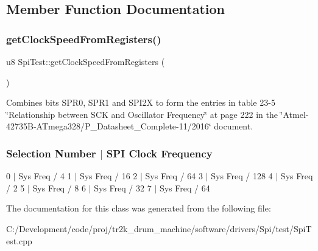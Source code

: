 \subsection{Member Function Documentation}
\mbox{\label{class_spi_test_a6f3260038241bf80545cddf4e1d73130}} 
\subsubsection{\texorpdfstring{getClockSpeedFromRegisters()}{getClockSpeedFromRegisters()}}
{\footnotesize\ttfamily u8 Spi\+Test\+::get\+Clock\+Speed\+From\+Registers (\begin{DoxyParamCaption}{ }\end{DoxyParamCaption})\hspace{0.3cm}{\ttfamily [inline]}}

Combines bits S\+P\+R0, S\+P\+R1 and S\+P\+I2X to form the entries in table 23-\/5 \char`\"{}\+Relationship between S\+C\+K and Oscillator Frequency\char`\"{} at page 222 in the \char`\"{}\+Atmel-\/42735\+B-\/\+A\+Tmega328/\+P\+\_\+\+Datasheet\+\_\+\+Complete-\/11/2016\char`\"{} document.

\subsubsection*{Selection Number $\vert$ S\+PI Clock Frequency }

0 $\vert$ Sys Freq / 4 1 $\vert$ Sys Freq / 16 2 $\vert$ Sys Freq / 64 3 $\vert$ Sys Freq / 128 4 $\vert$ Sys Freq / 2 5 $\vert$ Sys Freq / 8 6 $\vert$ Sys Freq / 32 7 $\vert$ Sys Freq / 64 

The documentation for this class was generated from the following file\+:\begin{DoxyCompactItemize}
\item 
C\+:/\+Development/code/proj/tr2k\+\_\+drum\+\_\+machine/software/drivers/\+Spi/test/Spi\+Test.\+cpp\end{DoxyCompactItemize}
